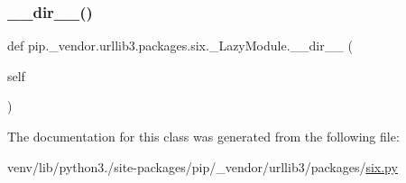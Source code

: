 \subsubsection{\texorpdfstring{\+\_\+\+\_\+dir\+\_\+\+\_\+()}{\_\_dir\_\_()}}
{\footnotesize\ttfamily def pip.\+\_\+vendor.\+urllib3.\+packages.\+six.\+\_\+\+Lazy\+Module.\+\_\+\+\_\+dir\+\_\+\+\_\+ (\begin{DoxyParamCaption}\item[{}]{self }\end{DoxyParamCaption})}



The documentation for this class was generated from the following file\+:\begin{DoxyCompactItemize}
\item 
venv/lib/python3./site-\/packages/pip/\+\_\+vendor/urllib3/packages/\hyperlink{pip_2__vendor_2urllib3_2packages_2six_8py}{six.\+py}\end{DoxyCompactItemize}
